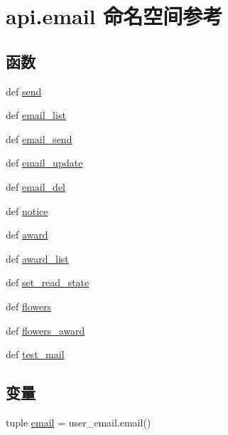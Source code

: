 \hypertarget{namespaceapi_1_1email}{\section{api.\-email 命名空间参考}
\label{namespaceapi_1_1email}
}
\subsection*{函数}
\begin{DoxyCompactItemize}
\item 
def \hyperlink{namespaceapi_1_1email_a68691a07d494c080e6f8baac68273c99}{send}
\item 
def \hyperlink{namespaceapi_1_1email_a7df560a32073c46124e19159338d5bad}{email\-\_\-list}
\item 
def \hyperlink{namespaceapi_1_1email_a6d9690a8e09861fb5dbbe79180e119ed}{email\-\_\-send}
\item 
def \hyperlink{namespaceapi_1_1email_a3f6d0264379dfd5f0a43770acccca050}{email\-\_\-update}
\item 
def \hyperlink{namespaceapi_1_1email_a20403faad925bf765349732070874808}{email\-\_\-del}
\item 
def \hyperlink{namespaceapi_1_1email_a4db61f8cf4d9d89a072ca2156e0faf6d}{notice}
\item 
def \hyperlink{namespaceapi_1_1email_a5519aa8d4ece44885a6627f453c47599}{award}
\item 
def \hyperlink{namespaceapi_1_1email_a25a5d0d279ba1326b8fb01c5e7a3eb78}{award\-\_\-list}
\item 
def \hyperlink{namespaceapi_1_1email_a4fca38451988a83e93116b39d719f4f7}{set\-\_\-read\-\_\-state}
\item 
def \hyperlink{namespaceapi_1_1email_a502d947bfcbcad6b1d73ea9f9481a9cb}{flowers}
\item 
def \hyperlink{namespaceapi_1_1email_a9e32942877f7970826b5c2550e553a5a}{flowers\-\_\-award}
\item 
def \hyperlink{namespaceapi_1_1email_a5f98224254badc3cc47870acc90fd5a5}{test\-\_\-mail}
\end{DoxyCompactItemize}
\subsection*{变量}
\begin{DoxyCompactItemize}
\item 
tuple \hyperlink{namespaceapi_1_1email_aade8d3be9c6c1e1189c6a86006c0321c}{email} = user\-\_\-email.\-email()
\end{DoxyCompactItemize}


